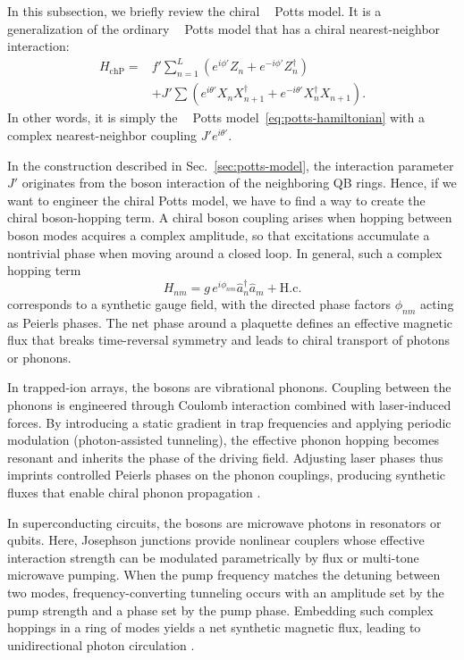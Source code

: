 \documentclass[reprint, aps, prx, amsmath, amssymb, longbibliography, superscriptaddress]{revtex4-2}
\DeclareMathOperator{\Zthree}{\mathbb{Z}_3}
\begin{document}
In this subsection, we briefly review the chiral $\Zthree$ Potts model. It is a generalization of the ordinary $\Zthree$ Potts model that has a chiral nearest-neighbor interaction:
\begin{equation}
\label{eq:chiral-potts-hamiltonian}
\begin{aligned}
    H_{\text{chP}} = &f'\sum_{n=1}^L (e^{i\phi'} Z_n + e^{-i\phi'} Z_n^{\dagger}) \\
    &+ J' \sum (e^{i\theta'} X_n X_{n+1}^{\dagger} + e^{-i\theta'} X_n^{\dagger} X_{n+1}).
\end{aligned}
\end{equation}
In other words, it is simply the $\Zthree$ Potts model~\eqref{eq:potts-hamiltonian} with a complex nearest-neighbor coupling $J'e^{i\theta'}$. 

In the construction described in Sec.~\ref{sec:potts-model}, the interaction parameter $J'$ originates from the boson interaction of the neighboring QB rings. Hence, if we want to engineer the chiral Potts model, we have to find a way to create the chiral boson-hopping term. A chiral boson coupling arises when hopping between boson modes acquires a complex amplitude, so that excitations accumulate a nontrivial phase when moving around a closed loop. In general, such a complex hopping term
\begin{equation}
H_{nm} = g \, e^{i\phi_{nm}} \hat a_n^\dagger \hat a_m + \mathrm{H.c.}
\end{equation}
corresponds to a synthetic gauge field, with the directed phase factors $\phi_{nm}$ acting as Peierls phases. The net phase around a plaquette defines an effective magnetic flux that breaks time-reversal symmetry and leads to chiral transport of photons or phonons.

In trapped-ion arrays, the bosons are vibrational phonons. Coupling between the phonons is engineered through Coulomb interaction combined with laser-induced forces. By introducing a static gradient in trap frequencies and applying periodic modulation (photon-assisted tunneling), the effective phonon hopping becomes resonant and inherits the phase of the driving field. Adjusting laser phases thus imprints controlled Peierls phases on the phonon couplings, producing synthetic fluxes that enable chiral phonon propagation \cite{bermudez_synthetic_2011, schneider_experimental_2012a,vermersch_implementation_2016,roushan_chiral_2017,kiefer_floquetengineered_2019,bazavan_synthetic_2024}.

In superconducting circuits, the bosons are microwave photons in resonators or qubits. Here, Josephson junctions provide nonlinear couplers whose effective interaction strength can be modulated parametrically by flux or multi-tone microwave pumping. When the pump frequency matches the detuning between two modes, frequency-converting tunneling occurs with an amplitude set by the pump strength and a phase set by the pump phase. Embedding such complex hoppings in a ring of modes yields a net synthetic magnetic flux, leading to unidirectional photon circulation \cite{kapit_quantum_2013,sliwa_reconfigurable_2015,gu_microwave_2017, cao_parametrically_2024}.
\end{document}
